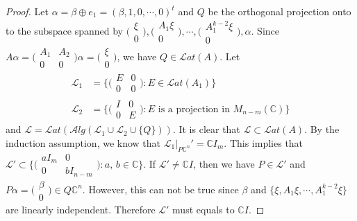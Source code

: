 \documentclass[a4paper,10pt]{amsart}
\theoremstyle{refs}
\newcommand{\LLL}{\mathcal L} %
\newcommand{\Lat}{\mathcal Lat}
\newcommand{\Alg}{\mathcal Alg}
\newcommand{\C}{\mathbb C} %
\begin{document}
\begin{proof}
Let $\alpha= \beta \oplus e_1 = (\beta,1,0,\cdots,0)^{t}$ and $Q$ be the
orthogonal projection onto to the subspace spanned by
$\bigl(\begin{smallmatrix}
 \xi\\
 0
\end{smallmatrix} \bigr)
,
\bigl(\begin{smallmatrix}
 A_{1}\xi\\
 0
\end{smallmatrix} \bigr),\cdots,
\bigl(\begin{smallmatrix}
 A_{1}^{k-2}\xi\\
 0
\end{smallmatrix} \bigr),
\alpha$. Since
$A\alpha=
\bigl(\begin{smallmatrix}
 A_1 & A_2\\
 0 & 0
\end{smallmatrix} \bigr)\alpha
= \bigl(\begin{smallmatrix}
 \xi\\
 0
\end{smallmatrix} \bigr)$,
we have $Q\in\Lat(A)$.
Let
\begin{align*}
\LLL_1 &= \{
\bigl(\begin{smallmatrix}
 E & 0\\
 0 & 0
\end{smallmatrix} \bigr) : E\in
\Lat(A_{1})\}\\
\LLL_2 &=
\{
\bigl(\begin{smallmatrix}
 I & 0\\
 0 & E
\end{smallmatrix} \bigr)
: E \mbox{ is a projection in } M_{n-m}(\mathbb{C})\}
\end{align*}
and
$\LLL = \Lat(\Alg(\LLL_1 \cup \LLL_2 \cup \{Q \}))$.
It is clear that $\LLL \subset \Lat(A)$.
By the induction assumption, we know that $\LLL_1 |_{P\C^{n}} ' = \C I_{m}$.
This implies that $\LLL' \subset \{\bigl(\begin{smallmatrix}
 aI_{m} & 0\\
 0 & bI_{n-m}
\end{smallmatrix} \bigr) : a \mbox{, } b \in \C \}$.
If $\LLL' \neq \C I$, then we have $P \in \LLL'$ and $P\alpha =
\bigl(\begin{smallmatrix}
 \beta\\
 0
\end{smallmatrix} \bigr) \in Q\C^{n}$. However, this can not be true since
$\beta$ and $\{\xi,A_{1}\xi,\cdots,A_{1}^{k-2}\xi\}$ are linearly
independent. Therefore $\LLL'$ must equals to $\C I$.


\end{proof}
\end{document}
